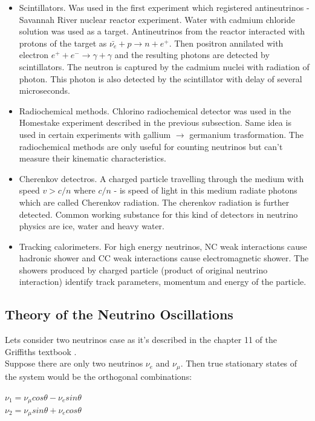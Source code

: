 \begin{itemize}
  \item Scintillators. Was used in the first experiment which registered antineutrinos - Savannah River nuclear reactor experiment. Water with cadmium chloride solution was used as a target. Antineutrinos from the reactor interacted with protons of the target as $\bar{\nu_e}+p \rightarrow n+e^+$. Then positron annilated with electron $e^+ + e^- \rightarrow \gamma + \gamma$ and the resulting photons are detected by scintillators. The neutron is captured by the cadmium nuclei with radiation of photon. This photon is also detected by the scintillator with delay of several microseconds. 
  \item Radiochemical methods. Chlorino radiochemical detector was used in the Homestake experiment described in the previous subsection. Same idea is used in certain experiments with gallium $\rightarrow$ germanium trasformation. The radiochemical methods are only useful for counting neutrinos but can't measure their kinematic characteristics.
  \item Cherenkov detectros. A charged particle travelling through the medium with speed $v>c/n$ where $c/n$ - is speed of light in this medium radiate photons which are called Cherenkov radiation. The cherenkov radiation is further detected. Common working substance for this kind of detectors in neutrino physics are ice, water and heavy water.
  \item Tracking calorimeters. For high energy neutrinos, NC weak interactions cause hadronic shower and CC weak interactions cause electromagnetic shower. The showers produced by charged particle (product of original neutrino interaction) identify track parameters, momentum and energy of the particle.
\end{itemize}


\subsection{Theory of the Neutrino Oscillations}
Lets consider two neutrinos case as it's described in the chapter 11 of the Griffiths textbook \cite{ref_Griffiths}.\\
Suppose there are only two neutrinos $\nu_e$ and $\nu_{\mu}$. Then true stationary states of the system would be the orthogonal combinations:\\

\begin{center}
$\nu_1=\nu_{\mu}cos\theta-\nu_esin\theta$\\
$\nu_2=\nu_{\mu}sin\theta+\nu_ecos\theta$\\
\end{center}

